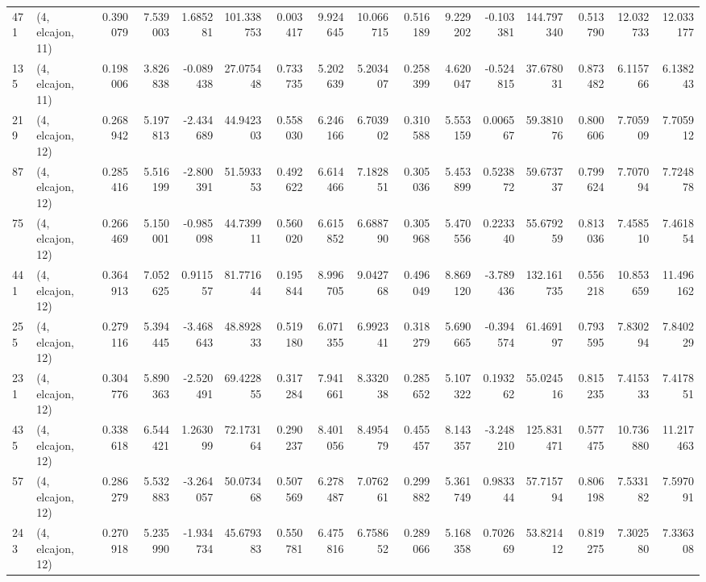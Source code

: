 \begin{tabular}{llrrrrrrrrrrrrrr}
471 &  (4, elcajon, 11) &   0.390079 &   7.539003 &   1.685281 &   101.338753 &   0.003417 &   9.924645 &  10.066715 &  0.516189 &   9.229202 &  -0.103381 &   144.797340 &  0.513790 &  12.032733 &  12.033177 \\
135 &  (4, elcajon, 11) &   0.198006 &   3.826838 &  -0.089438 &    27.075448 &   0.733735 &   5.202639 &   5.203407 &  0.258399 &   4.620047 &  -0.524815 &    37.678031 &  0.873482 &   6.115766 &   6.138243 \\
219 &  (4, elcajon, 12) &   0.268942 &   5.197813 &  -2.434689 &    44.942303 &   0.558030 &   6.246166 &   6.703902 &  0.310588 &   5.553159 &   0.006567 &    59.381076 &  0.800606 &   7.705909 &   7.705912 \\
87  &  (4, elcajon, 12) &   0.285416 &   5.516199 &  -2.800391 &    51.593353 &   0.492622 &   6.614466 &   7.182851 &  0.305036 &   5.453899 &   0.523872 &    59.673737 &  0.799624 &   7.707094 &   7.724878 \\
75  &  (4, elcajon, 12) &   0.266469 &   5.150001 &  -0.985098 &    44.739911 &   0.560020 &   6.615852 &   6.688790 &  0.305968 &   5.470556 &   0.223340 &    55.679259 &  0.813036 &   7.458510 &   7.461854 \\
441 &  (4, elcajon, 12) &   0.364913 &   7.052625 &   0.911557 &    81.771644 &   0.195844 &   8.996705 &   9.042768 &  0.496049 &   8.869120 &  -3.789436 &   132.161735 &  0.556218 &  10.853659 &  11.496162 \\
255 &  (4, elcajon, 12) &   0.279116 &   5.394445 &  -3.468643 &    48.892833 &   0.519180 &   6.071355 &   6.992341 &  0.318279 &   5.690665 &  -0.394574 &    61.469197 &  0.793595 &   7.830294 &   7.840229 \\
231 &  (4, elcajon, 12) &   0.304776 &   5.890363 &  -2.520491 &    69.422855 &   0.317284 &   7.941661 &   8.332038 &  0.285652 &   5.107322 &   0.193262 &    55.024516 &  0.815235 &   7.415333 &   7.417851 \\
435 &  (4, elcajon, 12) &   0.338618 &   6.544421 &   1.263099 &    72.173164 &   0.290237 &   8.401056 &   8.495479 &  0.455457 &   8.143357 &  -3.248210 &   125.831471 &  0.577475 &  10.736880 &  11.217463 \\
57  &  (4, elcajon, 12) &   0.286279 &   5.532883 &  -3.264057 &    50.073468 &   0.507569 &   6.278487 &   7.076261 &  0.299882 &   5.361749 &   0.983344 &    57.715794 &  0.806198 &   7.533182 &   7.597091 \\
243 &  (4, elcajon, 12) &   0.270918 &   5.235990 &  -1.934734 &    45.679383 &   0.550781 &   6.475816 &   6.758652 &  0.289066 &   5.168358 &   0.702669 &    53.821412 &  0.819275 &   7.302580 &   7.336308 \\

\end{tabular}
